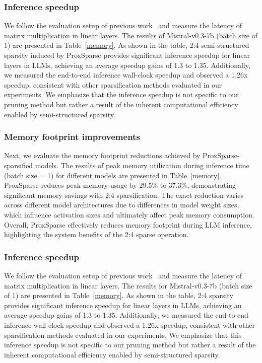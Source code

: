 \subsubsection{Inference speedup}
We follow the evaluation setup of previous work~\cite{frantar2023sparsegpt,sun2023simple} and measure the latency of matrix multiplication in linear layers. The results of Mistral-v0.3-7b (batch size of 1) are presented in Table~\ref{memory}. As shown in the table, 2:4 semi-structured sparsity induced by ProxSparse provides significant inference speedup for linear layers in LLMs, achieving an average speedup gains of 1.3 to 1.35. Additionally, we measured the end-to-end inference wall-clock speedup and observed a 1.26x speedup, consistent with other sparsification methods evaluated in our experiments. We emphasize that the inference speedup is not specific to our pruning method but rather a result of the inherent computational efficiency enabled by semi-structured sparsity.

\subsubsection{Memory footprint improvements}

Next, we evaluate the memory footprint reductions achieved by ProxSparse-sparsified models. The results of peak memory utilization during inference time (batch size = 1) for different models are presented in Table~\ref{memory}. ProxSparse reduces peak memory usage by 29.5\% to 37.3\%, demonstrating significant memory savings with 2:4 sparsification. The exact reduction varies across different model architectures due to differences in model weight sizes, which influence activation sizes and ultimately affect peak memory consumption. Overall, ProxSparse effectively reduces memory footprint during LLM inference, highlighting the system benefits of the 2:4 sparse operation.

\subsubsection{Inference speedup}
We follow the evaluation setup of previous work~\cite{frantar2023sparsegpt,sun2023simple} and measure the latency of matrix multiplication in linear layers. The results for Mistral-v0.3-7b (batch size of 1) are presented in Table~\ref{memory}. As shown in the table, 2:4 sparsity provides significant inference speedup for linear layers in LLMs, achieving an average speedup gains of 1.3 to 1.35. Additionally, we measured the end-to-end inference wall-clock speedup and observed a 1.26x speedup, consistent with other sparsification methods evaluated in our experiments. We emphasize that this inference speedup is not specific to our pruning method but rather a result of the inherent computational efficiency enabled by semi-structured sparsity.

